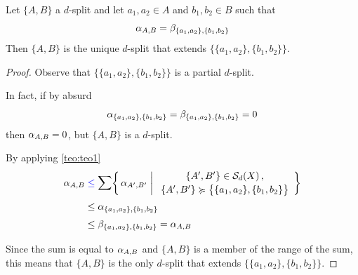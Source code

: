 \documentclass[./main.tex]{subfiles}
\begin{document}
\clearpage

\begin{figure}[h]
    \centering
\end{figure}

\begin{corollary}[{\cites[Corollary 1]{BD92a}}] \label{cor:cor1}
    Let $\{A,B\}$ a $d$-split and let $a_1,a_2 \in A$ and $b_1,b_2 \in B$ such that
    \[ \alpha_{A,B} = \beta_{\{a_1,a_2\},\{b_1,b_2\}} \]
    Then $\{A,B\}$ is the unique $d$-split that extends $\bigl\{ \{a_1,a_2\},\{b_1,b_2\} \bigr\}$.
\end{corollary}
\begin{proof}
    Observe that $\bigl\{ \{a_1,a_2\},\{b_1,b_2\} \bigr\}$ is a partial $d$-split.
    
    In fact, if by absurd
    \[ \alpha_{\{a_1,a_2\},\{b_1,b_2\}} = \beta_{\{a_1,a_2\},\{b_1,b_2\}} = 0 \eqspace{-5pt}{2pt} \]
    then $\alpha_{A,B} = 0$, but $\{A,B\}$ is a $d$-split. \absurd

    By applying \autoref{teo:teo1}
    \begin{align*}
        \aAB &\mathcolor{blue}{\leq} \mathlarger{\sum} \biggl\{\, \alpha_{A^\prime,B^\prime} \mathrel{\bigg|}
            \begin{array}{c}
                \{A^\prime,B^\prime\} \in \Sc_d(X) \,,  \\[2pt]
                 \{A^\prime,B^\prime\} \succcurlyeq \bigl\{ \{a_1,a_2\},\{b_1,b_2\} \bigr\}
            \end{array}
        \biggr\} \\
        &\leq \alpha_{\{a_1,a_2\},\{b_1,b_2\}} \\
        &\leq \beta_{\{a_1,a_2\},\{b_1,b_2\}} = \aAB
    \end{align*}

    Since the sum is equal to $\alpha_{A,B}$ and $\{A,B\}$ is a member of the range of the sum, this means that $\{A,B\}$ is the only $d$-split that extends $\bigl\{ \{a_1,a_2\},\{b_1,b_2\} \bigr\}$.
\end{proof}
\end{document}
